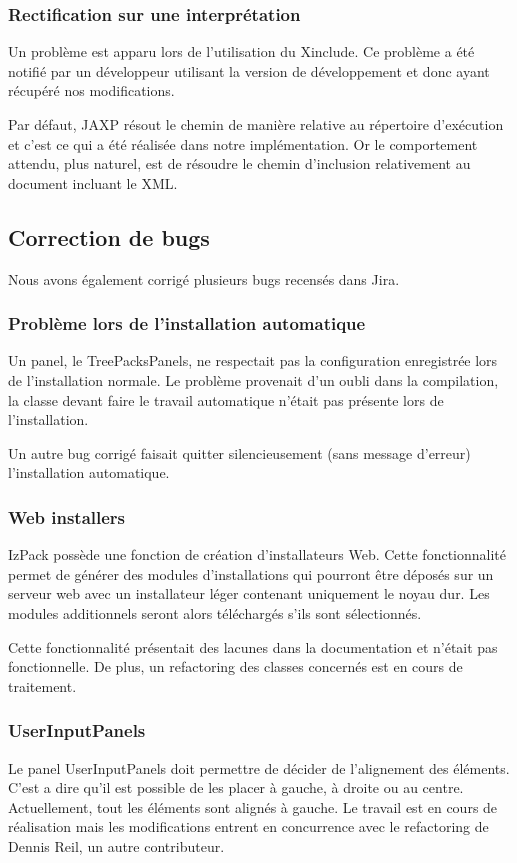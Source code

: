\subsubsection{Rectification sur une interprétation}
Un problème est apparu lors de l'utilisation du Xinclude.
Ce problème a été notifié par un développeur utilisant la version de développement et donc ayant récupéré nos modifications.

Par défaut, JAXP résout le chemin de manière relative au répertoire d'exécution et c'est ce qui a été réalisée dans notre implémentation.
Or le comportement attendu, plus naturel, est de résoudre le chemin d'inclusion relativement au document incluant le XML.

\subsection{Correction de bugs}
Nous avons également corrigé plusieurs bugs recensés dans Jira.
\subsubsection{Problème lors de l'installation automatique}
Un panel, le TreePacksPanels, ne respectait pas la configuration enregistrée lors de l'installation normale.
Le problème provenait d'un oubli dans la compilation, la classe devant faire le travail automatique n'était pas présente lors de l'installation.

Un autre bug corrigé faisait quitter silencieusement (sans message d'erreur) l'installation automatique.
\subsubsection{Web installers}
IzPack possède une fonction de création d'installateurs Web.
Cette fonctionnalité permet de générer des modules d'installations qui pourront être déposés sur un serveur web avec un installateur léger contenant uniquement le noyau dur.
Les modules additionnels seront alors téléchargés s'ils sont sélectionnés.

Cette fonctionnalité présentait des lacunes dans la documentation et n'était pas fonctionnelle.
De plus, un refactoring des classes concernés est en cours de traitement.
\subsubsection{UserInputPanels}
Le panel UserInputPanels doit permettre de décider de l'alignement des éléments.
C'est a dire qu'il est possible de les placer à gauche, à droite ou au centre. Actuellement, tout les éléments sont alignés à gauche.
Le travail est en cours de réalisation mais les modifications entrent en concurrence avec le refactoring de Dennis Reil, un autre contributeur.

